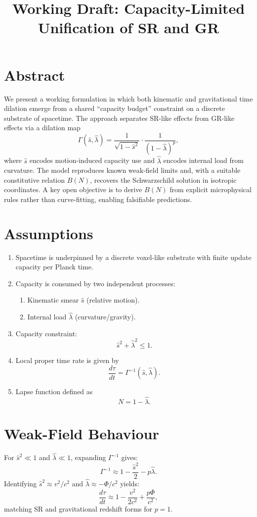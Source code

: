 \documentclass[12pt]{article}
\title{Working Draft: Capacity-Limited Unification of SR and GR}
\author{}
\date{}
\begin{document}
\maketitle

\section*{Abstract}
We present a working formulation in which both kinematic and gravitational time dilation emerge from a shared ``capacity budget'' constraint on a discrete substrate of spacetime. The approach separates SR-like effects from GR-like effects via a dilation map 
\[
\Gamma(\hat{s},\hat{\lambda}) = \frac{1}{\sqrt{1-\hat{s}^2}} \cdot \frac{1}{(1-\hat{\lambda})^p},
\]
where $\hat{s}$ encodes motion-induced capacity use and $\hat{\lambda}$ encodes internal load from curvature.  
The model reproduces known weak-field limits and, with a suitable constitutive relation $B(N)$, recovers the Schwarzschild solution in isotropic coordinates. A key open objective is to derive $B(N)$ from explicit microphysical rules rather than curve-fitting, enabling falsifiable predictions.

\section{Assumptions}
\begin{enumerate}
\item Spacetime is underpinned by a discrete voxel-like substrate with finite update capacity per Planck time.
\item Capacity is consumed by two independent processes:
  \begin{enumerate}
    \item Kinematic smear $\hat{s}$ (relative motion).
    \item Internal load $\hat{\lambda}$ (curvature/gravity).
  \end{enumerate}
\item Capacity constraint:
\[
\hat{s}^2 + \hat{\lambda}^2 \leq 1.
\]
\item Local proper time rate is given by
\[
\frac{d\tau}{dt} = \Gamma^{-1}(\hat{s},\hat{\lambda}).
\]
\item Lapse function defined as
\[
N = 1 - \hat{\lambda}.
\]
\end{enumerate}

\section{Weak-Field Behaviour}
For $\hat{s}^2 \ll 1$ and $\hat{\lambda} \ll 1$, expanding $\Gamma^{-1}$ gives:
\[
\Gamma^{-1} \approx 1 - \frac{\hat{s}^2}{2} - p \hat{\lambda}.
\]
Identifying $\hat{s}^2 \approx v^2/c^2$ and $\hat{\lambda} \approx -\Phi/c^2$ yields:
\[
\frac{d\tau}{dt} \approx 1 - \frac{v^2}{2c^2} + \frac{p\Phi}{c^2},
\]
matching SR and gravitational redshift forms for $p=1$.
\end{document}
